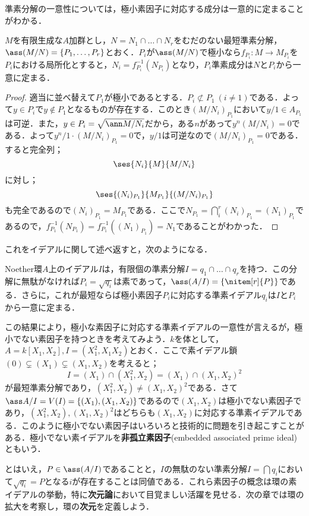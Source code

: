 準素分解の一意性については，極小素因子に対応する成分は一意的に定まることがわかる．
\begin{thm}\label{thm:準素成分の一意性}
	$M$を有限生成な$A$加群とし，$N=N_1\cap\dots\cap N_r$をむだのない最短準素分解，$\ass(M/N)=\{P_1,\dots,P_r\}$とおく．$P_i$が$\ass(M/N)$で極小なら$f_{P_i}:M\longrightarrow M_{P_i}$を$P_i$における局所化とすると，$N_i=f^{-1}_{P_i}(N_{P_i})$となり，$P_i$準素成分は$N$と$P_i$から一意に定まる．
\end{thm}
\begin{proof}
	適当に並べ替えて$P_1$が極小であるとする．$P_i\not\subset P_1~(i\neq1)$である．よって$y\in P_i$で$y\not\in P_1$となるものが存在する．このとき$(M/N_i)_{P_1}$において$y/1\in A_{P_1}$は可逆．また，$y\in P_i=\sqrt{\ann M/N_i}$だから，ある$n$があって$y^n(M/N_i)=0$である．よって$y^n/1\cdot (M/N_i)_{P_1}=0$で，$y/1$は可逆なので$(M/N_i)_{P_1}=0$である．すると完全列；
	\[\ses{N_i}{M}{M/N_i}\]
	に対し；
	\[\ses{(N_i)_{P_1}}{M_{P_1}}{(M/N_i)_{P_1}}\]
	も完全であるので$(N_i)_{P_1}=M_{P_1}$である．ここで$N_{P_1}=\bigcap_i^r (N_i)_{P_1}=(N_1)_{P_1}$であるので，$f^{-1}_{P_1}(N_{P_1})=f^{-1}_{P_1}((N_1)_{P_1})=N_1$であることがわかった．
\end{proof}

これをイデアルに関して述べ返すと，次のようになる．
\begin{cor}\label{cor:イデアルの準素分解}
	Noether環$A$上のイデアル$I$は，有限個の準素分解$I= q_1\cap\dots\cap q_r$を持つ．この分解に無駄がなければ$P_i=\sqrt{q_i}$は素であって，$\ass (A/I)=\{\nitem[r]{P}\}$である．さらに，これが最短ならば極小素因子$P_i$に対応する準素イデアル$q_i$は$I$と$ P_i$から一意に定まる．
\end{cor}

この結果により，極小な素因子に対応する準素イデアルの一意性が言えるが，極小でない素因子を持つときを考えてみよう．$k$を体として，$A=k[X_1,X_2],I=(X_1^2,X_1X_2)$とおく．ここで素イデアル鎖$(0)\subsetneq (X_1)\subsetneq(X_1,X_2)$を考えると；
\[I=(X_1)\cap (X_1^2,X_2)=(X_1)\cap (X_1,X_2)^2\]
が最短準素分解であり，$(X_1^2,X_2)\neq(X_1,X_2)^2$である．さて$\ass A/I=V(I)=\{(X_1),(X_1,X_2)\}$であるので$(X_1,X_2)$は極小でない素因子であり，$(X_1^2,X_2),(X_1,X_2)^2$はどちらも$(X_1,X_2)$に対応する準素イデアルである．このように極小でない素因子はいろいろと技術的に問題を引き起こすことがある．極小でない素イデアルを\textbf{非孤立素因子}(embedded associated prime ideal)ともいう．

とはいえ，$P\in\ass (A/I)$であることと，$I$の無駄のない準素分解$I=\bigcap q_i$において$\sqrt{q_i}=P$となる$i$が存在することは同値である．これら素因子の概念は環の素イデアルの挙動，特に\textbf{次元論}において目覚ましい活躍を見せる．次の章では環の拡大を考察し，環の\textbf{次元}を定義しよう．